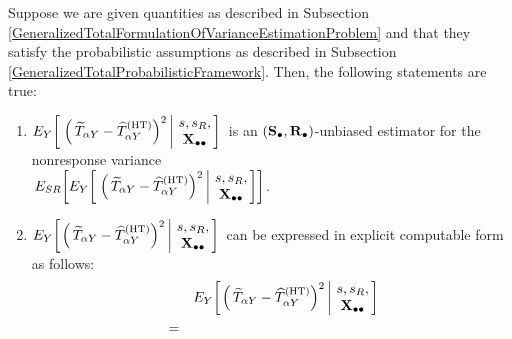 \vskip 0.1cm
\begin{lemma}
\label{GeneralizedTotalNonresponseVariance}
\mbox{}
\vskip 0.1cm
\noindent
Suppose we are given quantities as described in Subsection
\ref{GeneralizedTotalFormulationOfVarianceEstimationProblem}
and
that they satisfy the probabilistic assumptions as described in Subsection
\ref{GeneralizedTotalProbabilisticFramework}.
\vskip 0.1cm
\noindent
Then, the following statements are true:
\renewcommand{\theenumi}{\roman{enumi}}
\renewcommand{\labelenumi}{\mbox{}\;\;\,(\theenumi)$\quad$}
\begin{enumerate}
\item
    $
    E_{Y}\!\left[\,
        \left.
        \left(\,\widetilde{T}_{\alpha Y} - \widehat{T}^{\textnormal{(HT)}}_{\alpha Y}\right)^{2}
        \,\right\vert\!\!
        \begin{array}{c} s,s_{R}, \\ \mathbf{X}_{\bullet\bullet} \end{array}
        \!\!\right]
    $\,
    is an $(\mathbf{S}_{\bullet},\mathbf{R}_{\bullet})$-unbiased estimator for the nonresponse variance\\
    \,$
    E_{SR}\!\left[
    E_{Y}\!\left[\,
        \left.
        \left(\,\widetilde{T}_{\alpha Y} - \widehat{T}^{\textnormal{(HT)}}_{\alpha Y}\right)^{2}
        \,\right\vert\!\!
        \begin{array}{c} s,s_{R}, \\ \mathbf{X}_{\bullet\bullet} \end{array}
        \!\!\right]
        \right]
    $.
\item
    $
    E_{Y}\!\left[
        \left.
        \left(\,\widetilde{T}_{\alpha Y} - \widehat{T}^{\textnormal{(HT)}}_{\alpha Y}\right)^{2}
        \,\right\vert\!\!
        \begin{array}{c} s,s_{R}, \\ \mathbf{X}_{\bullet\bullet} \end{array}
        \!\!\right]
    $\,
    can be expressed in explicit computable form as follows:
    \begin{eqnarray*}
    &&
        E_{Y}\!\left[
            \left.
            \left(\,\widetilde{T}_{\alpha Y} - \widehat{T}^{\textnormal{(HT)}}_{\alpha Y}\right)^{2}
            \,\right\vert\!\!
            \begin{array}{c} s,s_{R}, \\ \Xobs \end{array}
            \!\!\right]
    \\
    & = &

\end{eqnarray*}
\end{enumerate}
\end{lemma}
